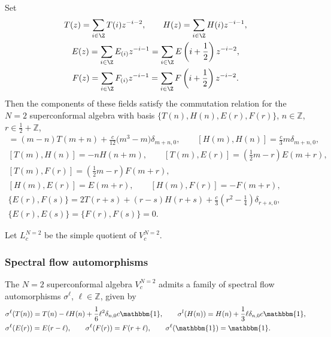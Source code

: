 Set
\begin{gather*}
 T(z) = \sum _{i \in {\Z}} T(i) z^{-i-2}, \qquad H(z) = \sum _{i \in {\Z}} H(i) z^{-i-1},\\
 E(z) = \sum _{i \in {\Z}} E_{(i)} z^{-i-1} = \sum _{i \in {\Z}} E\left(i+\frac{1}{2}\right)z^{-i-2},\\
 F(z) = \sum _{i \in {\Z}} F_{(i)} z^{-i-1} = \sum _{i \in {\Z}} F\left(i+\frac{1}{2}\right)z^{-i-2}.
 \end{gather*}
 Then the components of these fields satisfy the commutation relation for the $N=2$ superconformal algebra with basis $\{T(n), H(n), E(r), F(r)\}$, $n \in \mathbb{Z}$, $r \in \frac{1}{2}+\mathbb{Z}$,
\begin{gather*}
	[T(m), T(n)] = (m-n)T(m+n) + \frac{c}{12}\bigl(m^3 - m\bigr)\delta_{m+n,0}, \qquad [H(m), H(n)] = \frac{c}{3}m\delta_{m+n,0}, \\
	[T(m), H(n)] = -nH(n+m), \qquad [ T(m) , E(r) ] = \left(\frac{1}{2} m-r \right)E(m+r), \\
 [ T(m) , F(r) ] = \left(\frac{1}{2} m-r \right)F(m+r), \\
	[ H(m) ,E(r)] = E(m+r), \qquad [ H(m) , F(r)] = -F(m+r), \\
	\{E(r), F(s) \} = 2 T({r + s}) + ( r - s )H(r + s) + \frac{c}{3}\left( r^2 - \frac{1}{4} \right)\delta_{r+s,0}, \\
	\{E(r), E(s) \} = \{F(r), F(s) \} = 0.
\end{gather*}

 Let $L^{N=2}_{c}$ be the simple quotient of $V^{N=2}_{c}$.

\subsubsection{Spectral flow automorphisms}
The $N=2$ superconformal algebra $V^{N=2}_{c}$ admits a family of spectral flow automorphisms $\sigma^\ell$, $\ell \in \mathbb{Z}$, given by
\begin{align*}
\begin{aligned}
	& \sigma^\ell(T(n))= T(n) -\ell H(n) + \frac{1}{6}\ell ^2\delta_{n,0}c\mathbbm{1}, \qquad \sigma^l(H(n)) = H(n) + \frac{1}{3}\ell \delta_{n,0}c\mathbbm{1},  \\
	& \sigma^\ell(E(r))= E({r-\ell}), \qquad \sigma^\ell(F(r)) = F({r+\ell}), \qquad \sigma^\ell(\mathbbm{1}) = \mathbbm{1}.
\end{aligned}
\end{align*}



